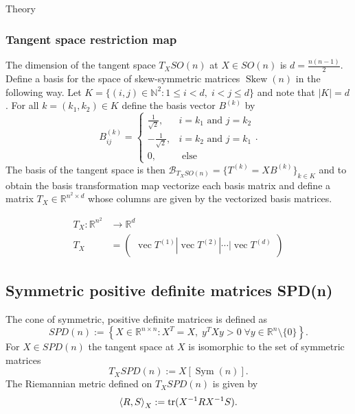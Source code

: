 \begin{chapter}{Theory}
\subsubsection{Tangent space restriction map} %
\label{ssub:TangentSO}
The dimension of the tangent space $T_XSO(n)$ at $X\in SO(n)$ is $d=\frac{n(n-1)}{2}$. Define a basis for the space of skew-symmetric matrices $\operatorname{Skew}(n)$ in the following
way. Let $K = \lbrace (i,j)\in\mathbb{N}^2: 1\leq i < d,\; i < j \leq d  \rbrace$ and note that $|K|=d$. For all $k=(k_1,k_2)\in K$ define the basis vector $B^{(k)}$ by 
\begin{equation}
    B^{(k)}_{ij}=\begin{cases}
	\frac{1}{\sqrt{2}}, & i=k_1 \text{ and } j=k_2\\
	-\frac{1}{\sqrt{2}}, & i=k_2 \text{ and } j=k_1\\
	0, & \text{ else }
    \end{cases}.
\end{equation}
The basis of the tangent space is then $\mathcal{B}_{T_XSO(n)}=\lbrace T^{(k)} = XB^{(k)} \rbrace_{k\in K}$ and to obtain the basis transformation map vectorize each basis matrix and define a matrix $T_X\in\mathbb{R}^{n^2\times d}$ whose columns are given by the vectorized basis matrices.

\begin{align}
    T_X: \mathbb{R}^{n^2} &\to \mathbb{R}^{d}\\
    T_X&= \begin{pmatrix}
	\operatorname{vec}T^{(1)}|\operatorname{vec}T^{(2)}|\cdots|\operatorname{vec}T^{(d)}
    \end{pmatrix}
\end{align}


\subsection{Symmetric positive definite matrices SPD(n)} %
\label{sub:SPD(N)}
The cone of symmetric, positive definite matrices is defined as
\begin{equation}
    SPD(n):=\left\lbrace X\in\mathbb{R}^{n\times n}:X^T=X,\; y^TXy>0\; \forall y\in\mathbb{R}^n\setminus\lbrace 0\rbrace  \right\rbrace.
\end{equation}
For $X\in SPD(n)$ the tangent space at $X$ is isomorphic to the set of symmetric matrices
\begin{equation}
    T_XSPD(n):=X[\operatorname{Sym}(n)].
\end{equation}
The Riemannian metric defined on $T_XSPD(n)$ is given by
\begin{equation}
    \label{eq:spdmetric}
    \left\langle R,S \right\rangle_X := \operatorname{tr}(X^{-1}RX^{-1}S).
\end{equation}


\end{chapter}
